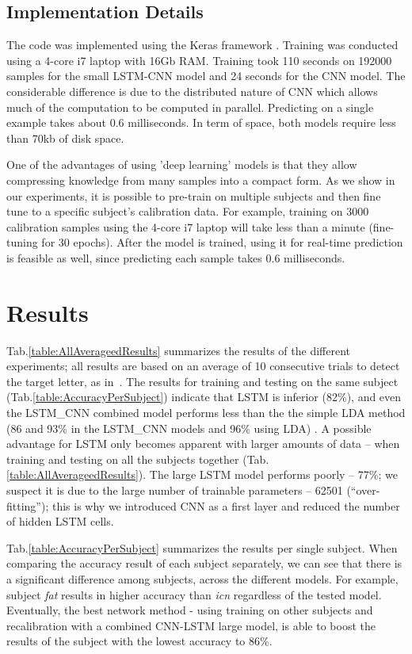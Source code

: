 \documentclass[
12pt, %
english, %
doublespacing, %
headsepline, %
]{MastersDoctoralThesis} %
\begin{document}
\section{Implementation Details}
The code was implemented using the Keras framework \cite{chollet2015keras}. Training was conducted using a 4-core i7 laptop with 16Gb RAM. Training took 110 seconds on 192000 samples for the small LSTM-CNN model and 24 seconds for the CNN model. The considerable difference is due to the distributed nature of  CNN which allows much of the computation to be computed in parallel. Predicting on a single example takes about 0.6 milliseconds. In term of space, both models require less than 70kb of disk space.

One of the advantages of using 'deep learning' models is that they allow compressing knowledge from many samples into a compact form. As we show in our experiments, it is possible to pre-train on multiple subjects and then fine tune to a specific subject's calibration data. For example, training on 3000 calibration samples using the 4-core i7 laptop will take less than a minute (fine-tuning for 30 epochs). After the model is trained, using it for real-time prediction is feasible as well, since predicting each sample takes 0.6 milliseconds.

\chapter{Results}

Tab.\ref{table:AllAverageedResults} summarizes the results of the different experiments; all results are based on an average of 10 consecutive trials to detect the target letter, as in~\cite{BlaknertzExperiment}. The results for training and testing on the same subject (Tab.\ref{table:AccuracyPerSubject}) indicate that LSTM is inferior (82\%), and even the LSTM\_CNN combined model performs less than the the simple LDA method (86 and 93\% in the LSTM\_CNN models and 96\% using LDA) . A possible advantage for LSTM only becomes apparent with larger amounts of data -- when training and testing on all the subjects together (Tab.\ref{table:AllAverageedResults}). The large LSTM model performs poorly -- 77\%; we suspect it is due to the large number of trainable parameters -- 62501 (``over-fitting''); this is why we introduced CNN as a first layer and reduced the number of hidden LSTM cells.

Tab.\ref{table:AccuracyPerSubject} summarizes the results per single subject. When comparing the accuracy result of each subject separately, we can see that there is a significant difference among subjects, across the different models. For example, subject \textit{fat} results in higher accuracy than \textit{icn} regardless of the tested model. Eventually, the best network method - using training on other subjects and recalibration with a combined CNN-LSTM large model, is able to boost the results of the subject with the lowest accuracy to 86\%.
\end{document}
